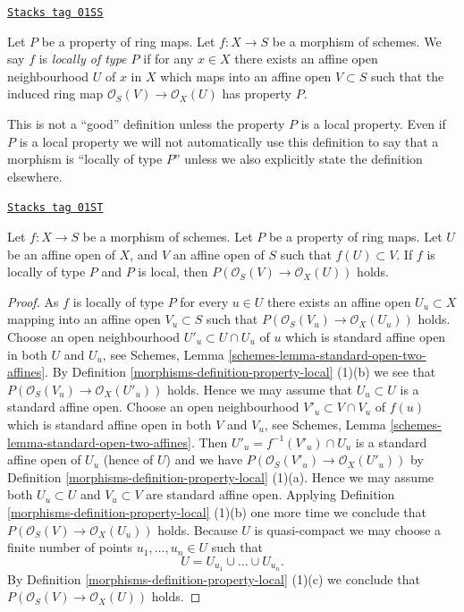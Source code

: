 \begin{definition}[Locally P]
\label{morphisms-definition-locally-P}
\href{https://stacks.math.columbia.edu/tag/01SS}{\texttt{Stacks tag 01SS}}

Let $P$ be a property of ring maps.
Let $f : X \to S$ be a morphism of schemes.
We say $f$ is {\it locally of type $P$} if for any $x \in X$
there exists an affine open neighbourhood $U$ of $x$
in $X$ which maps into an affine open $V \subset S$ such that
the induced ring map $\mathcal{O}_S(V) \to \mathcal{O}_X(U)$
has property $P$.
\end{definition}

This is not a ``good'' definition unless the property $P$ is
a local property. Even if $P$ is a local property we will not
automatically use this definition to say that a morphism is
``locally of type $P$'' unless we also explicitly state the
definition elsewhere.

\begin{lemma}[Locally P]
\label{morphisms-lemma-locally-P}
\href{https://stacks.math.columbia.edu/tag/01ST}{\texttt{Stacks tag 01ST}}

Let $f : X \to S$ be a morphism of schemes.
Let $P$ be a property of ring maps.
Let $U$ be an affine open of $X$,
and $V$ an affine open of $S$ such that
$f(U) \subset V$.
If $f$ is locally of type $P$ and $P$ is local,
then $P(\mathcal{O}_S(V) \to \mathcal{O}_X(U))$ holds.
\end{lemma}

\begin{proof}

As $f$ is locally of type $P$ for every $u \in U$ there exists an
affine open $U_u \subset X$ mapping into an affine open $V_u \subset S$
such that $P(\mathcal{O}_S(V_u) \to \mathcal{O}_X(U_u))$ holds.
Choose an open neighbourhood $U'_u \subset U \cap U_u$ of $u$
which is standard affine open in both $U$ and $U_u$, see
Schemes, Lemma \ref{schemes-lemma-standard-open-two-affines}.
By Definition \ref{morphisms-definition-property-local} (1)(b)
we see that $P(\mathcal{O}_S(V_u) \to \mathcal{O}_X(U'_u))$ holds.
Hence we may assume that $U_u \subset U$ is a standard affine open.
Choose an open neighbourhood $V'_u \subset V \cap V_u$
of $f(u)$ which is standard affine open in both $V$ and $V_u$, see
Schemes, Lemma \ref{schemes-lemma-standard-open-two-affines}.
Then $U'_u = f^{-1}(V'_u) \cap U_u$ is a standard affine open
of $U_u$ (hence of $U$) and we have
$P(\mathcal{O}_S(V'_u) \to \mathcal{O}_X(U'_u))$ by
Definition \ref{morphisms-definition-property-local} (1)(a).
Hence we may assume both $U_u \subset U$ and $V_u \subset V$
are standard affine open. Applying
Definition \ref{morphisms-definition-property-local} (1)(b)
one more time we conclude that $P(\mathcal{O}_S(V) \to \mathcal{O}_X(U_u))$
holds. Because $U$ is quasi-compact we may choose a finite number
of points $u_1, \ldots, u_n \in U$ such that
$$
U = U_{u_1} \cup \ldots \cup U_{u_n}.
$$
By Definition \ref{morphisms-definition-property-local} (1)(c)
we conclude that $P(\mathcal{O}_S(V) \to \mathcal{O}_X(U))$ holds.
\end{proof}

